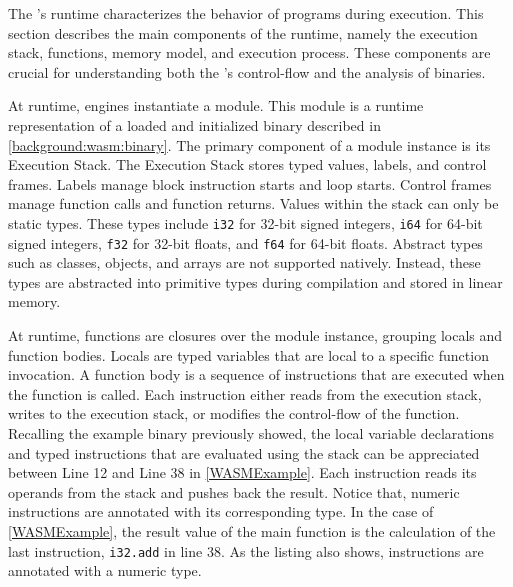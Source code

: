 \label{background:wasm:execution}

The \Wasm's runtime characterizes the behavior of \Wasm programs during execution. 
This section describes the main components of the \Wasm runtime, namely the execution stack, functions, memory model, and execution process. 
These components are crucial for understanding both the \Wasm's control-flow and the analysis of \Wasm binaries.


 At runtime, \Wasm engines instantiate a \Wasm module. 
This module is a runtime representation of a loaded and initialized \Wasm binary described in \autoref{background:wasm:binary}. 
The primary component of a module instance is its Execution Stack. 
The Execution Stack stores typed values, labels, and control frames. 
Labels manage block instruction starts and loop starts.
Control frames manage function calls and function returns.
Values within the stack can only be static types.
These types include \texttt{i32} for 32-bit signed integers, \texttt{i64} for 64-bit signed integers, \texttt{f32} for 32-bit floats, and \texttt{f64} for 64-bit floats. 
Abstract types such as classes, objects, and arrays are not supported natively. 
Instead, these types are abstracted into primitive types during compilation and stored in linear memory.


 At runtime, \Wasm functions are closures over the module instance, grouping locals and function bodies.
Locals are typed variables that are local to a specific function invocation.
A function body is a sequence of instructions that are executed when the function is called.
Each instruction either reads from the execution stack, writes to the execution stack, or modifies the control-flow of the function.
Recalling the example \Wasm binary previously showed, the local variable declarations and typed instructions that are evaluated using the stack can be appreciated between Line 12 and Line 38 in \autoref{WASMExample}. 
Each instruction reads its operands from the stack and pushes back the result. 
Notice that, numeric instructions are annotated with its corresponding type.
In the case of \autoref{WASMExample}, the result value of the main function is the calculation of the last instruction, \texttt{i32.add} in line 38. 
As the listing also shows, instructions are annotated with a numeric type.


